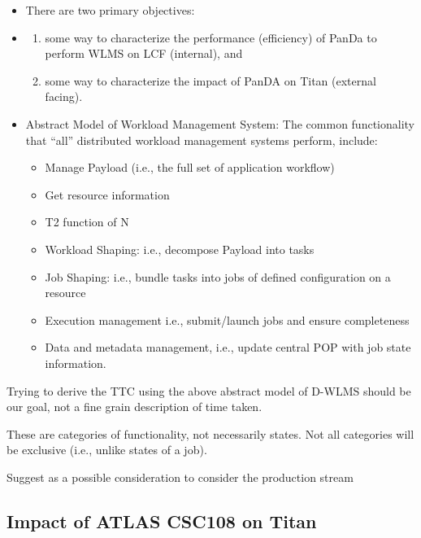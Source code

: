 \begin{itemize}
    \item There are two primary objectives:
    \item %
        \begin{enumerate}
            \item some way to characterize the performance (efficiency) of
                PanDa to perform WLMS on LCF (internal), and
            \item some way to characterize the impact of PanDA on Titan
                (external facing).
        \end{enumerate}
    \item Abstract Model of Workload Management System: The common
        functionality that ``all'' distributed workload management systems
        perform, include:
        \begin{itemize}
            \item Manage Payload (i.e., the full set of application workflow)
            \item Get resource information
            \item T2 function of N
            \item Workload Shaping: i.e., decompose Payload into tasks
            \item Job Shaping: i.e., bundle tasks into jobs of defined
                configuration on a resource
            \item Execution management i.e., submit/launch jobs and ensure
                completeness
            \item Data and metadata management, i.e., update central POP with
                job state information.
        \end{itemize}
\end{itemize}

Trying to derive the TTC using the above abstract model of D-WLMS should be our
goal, not a fine grain description of time taken.

These are categories of functionality, not necessarily states. Not all
categories will be exclusive (i.e., unlike states of a job). 

Suggest as a possible consideration to consider the production stream

\subsection{Impact of ATLAS CSC108 on Titan}
\label{subsec:csc108}

